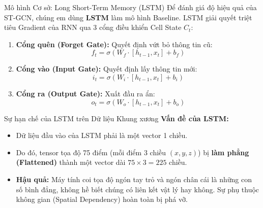 \documentclass[aspectratio=169]{beamer}
\begin{document}
\begin{frame}{Mô hình Cơ sở: Long Short-Term Memory (LSTM)}
    Để đánh giá độ hiệu quả của ST-GCN, chúng em dùng \textbf{LSTM} làm mô hình Baseline. LSTM giải quyết triệt tiêu Gradient của RNN qua 3 cổng điều khiển Cell State $C_t$:
    \begin{enumerate}
        \item \textbf{Cổng quên (Forget Gate):} Quyết định vứt bỏ thông tin cũ:
        \[ f_t = \sigma(W_f \cdot [h_{t-1}, x_t] + b_f) \]
        \item \textbf{Cổng vào (Input Gate):} Quyết định lấy thông tin mới:
        \[ i_t = \sigma(W_i \cdot [h_{t-1}, x_t] + b_i) \]
        \item \textbf{Cổng ra (Output Gate):} Xuất đầu ra ẩn:
        \[ o_t = \sigma(W_o \cdot [h_{t-1}, x_t] + b_o) \]
    \end{enumerate}
\end{frame}

\begin{frame}{Sự hạn chế của LSTM trên Dữ liệu Khung xương}
    \textbf{Vấn đề của LSTM:}
    \begin{itemize}
        \item Dữ liệu đầu vào của LSTM phải là một vector 1 chiều.
        \item Do đó, tensor tọa độ 75 điểm (mỗi điểm 3 chiều $(x,y,z)$) bị \textbf{làm phẳng (Flattened)} thành một vector dài $75 \times 3 = 225$ chiều.
        \item \textbf{Hậu quả:} Máy tính coi tọa độ ngón tay trỏ và ngón chân cái là những con số bình đẳng, không hề biết chúng có liên kết vật lý hay không. Sự phụ thuộc không gian (Spatial Dependency) hoàn toàn bị phá vỡ.
    \end{itemize}
\end{frame}
\end{document}
